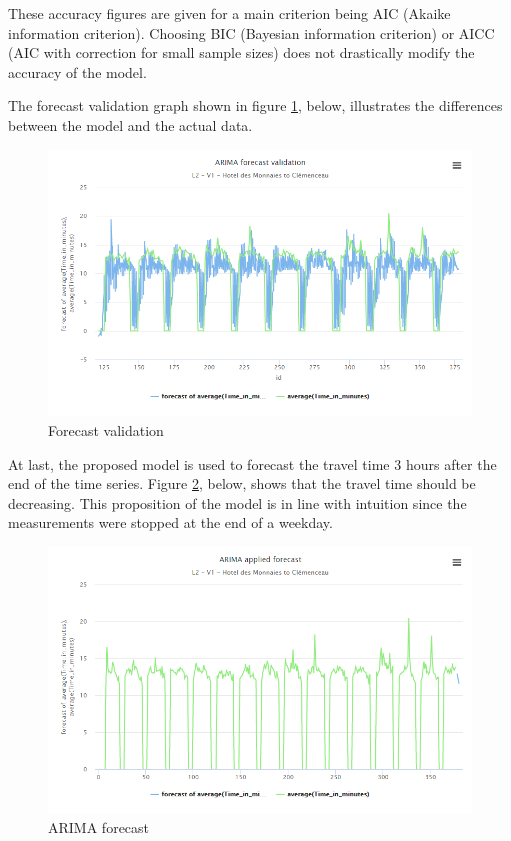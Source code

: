 \documentclass{article}
\begin{document}
These accuracy figures are given for a main criterion being AIC (Akaike information criterion). Choosing BIC (Bayesian information criterion) or AICC (AIC with correction for small sample sizes) does not drastically modify the accuracy of the model.

The forecast validation graph shown in figure \ref{fig:valid}, below, illustrates the differences between the model and the actual data.

 \begin{figure}[H]
    \centering
    \includegraphics[width=\textwidth]{images/Fig6.png} 
    \caption{Forecast validation}
    \label{fig:valid}
\end{figure}

At last, the proposed model is used to forecast the travel time 3 hours after the end of the time series. Figure \ref{fig:ARIMA}, below, shows that the travel time should be decreasing. This proposition of the model is in line with intuition since the measurements were stopped at the end of a weekday.

 \begin{figure}[H]
    \centering
    \includegraphics[width=\textwidth]{images/Fig7.png} 
    \caption{ARIMA forecast}
    \label{fig:ARIMA}
\end{figure}
\end{document}
